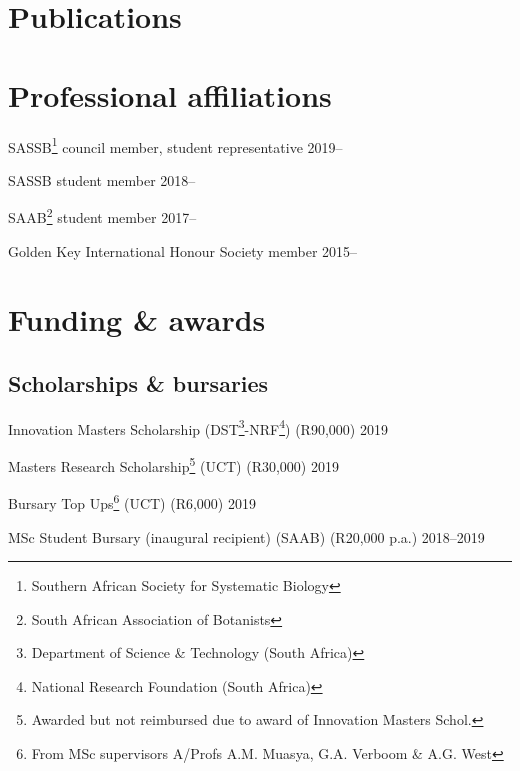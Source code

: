 \documentclass[10pt]{article}
\begin{document}
\bigskip

\section*{Publications} %



\bigskip

\section*{Professional affiliations} %

SASSB\footnote{Southern African Society for Systematic Biology} council member, 
student representative                                    \hfill 2019--

SASSB student member                                      \hfill 2018--

SAAB\footnote{South African Association of Botanists} student member
                                                          \hfill 2017--

Golden Key International Honour Society member            \hfill 2015--

\section*{Funding \& awards} %

\subsection*{Scholarships \& bursaries}

Innovation Masters Scholarship (DST\footnote{Department of Science \&
Technology (South Africa)}-NRF\footnote{National Research Foundation (South 
Africa)}) (R90,000)                                         \hfill 2019

Masters Research Scholarship\footnote{Awarded but not reimbursed due to award 
of Innovation Masters Schol.} (UCT) (R30,000)               \hfill 2019

Bursary Top Ups\footnote{From MSc supervisors A/Profs A.M. Muasya, G.A. Verboom 
\& A.G. West} (UCT) (R6,000)                                \hfill 2019

MSc Student Bursary (inaugural recipient) (SAAB) (R20,000 p.a.)
                                                      \hfill 2018--2019
\end{document}
